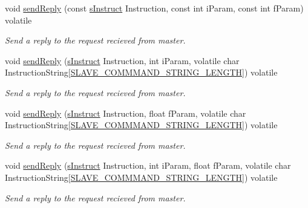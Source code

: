 \begin{DoxyCompactItemize}
void \mbox{\hyperlink{class_master_aa0f969c879b7d6ca105162ea2ca2c87e}{send\+Reply}} (const \mbox{\hyperlink{_s_p_i___instruction_set_8h_a949ec019a0f52780dcdd7d5a5ba73e47}{s\+Instruct}} Instruction, const int i\+Param, const int f\+Param) volatile
\begin{DoxyCompactList}\small\item\em Send a reply to the request recieved from master. \end{DoxyCompactList}\item 
void \mbox{\hyperlink{class_master_a075da7da71f50da0a5973ff65cc1a485}{send\+Reply}} (\mbox{\hyperlink{_s_p_i___instruction_set_8h_a949ec019a0f52780dcdd7d5a5ba73e47}{s\+Instruct}} Instruction, int i\+Param, volatile char Instruction\+String\mbox{[}\mbox{\hyperlink{_s_p_i___instruction_set_8h_afb2f23f8980c03317ec47ce151335ec7}{S\+L\+A\+V\+E\+\_\+\+C\+O\+M\+M\+M\+A\+N\+D\+\_\+\+S\+T\+R\+I\+N\+G\+\_\+\+L\+E\+N\+G\+TH}}\mbox{]}) volatile
\begin{DoxyCompactList}\small\item\em Send a reply to the request recieved from master. \end{DoxyCompactList}\item 
void \mbox{\hyperlink{class_master_acca62a1478bc305cdd8496f684ea3f9d}{send\+Reply}} (\mbox{\hyperlink{_s_p_i___instruction_set_8h_a949ec019a0f52780dcdd7d5a5ba73e47}{s\+Instruct}} Instruction, float f\+Param, volatile char Instruction\+String\mbox{[}\mbox{\hyperlink{_s_p_i___instruction_set_8h_afb2f23f8980c03317ec47ce151335ec7}{S\+L\+A\+V\+E\+\_\+\+C\+O\+M\+M\+M\+A\+N\+D\+\_\+\+S\+T\+R\+I\+N\+G\+\_\+\+L\+E\+N\+G\+TH}}\mbox{]}) volatile
\begin{DoxyCompactList}\small\item\em Send a reply to the request recieved from master. \end{DoxyCompactList}\item 
void \mbox{\hyperlink{class_master_a88fd38997e4ee0c26fd09a85477487fa}{send\+Reply}} (\mbox{\hyperlink{_s_p_i___instruction_set_8h_a949ec019a0f52780dcdd7d5a5ba73e47}{s\+Instruct}} Instruction, int i\+Param, float f\+Param, volatile char Instruction\+String\mbox{[}\mbox{\hyperlink{_s_p_i___instruction_set_8h_afb2f23f8980c03317ec47ce151335ec7}{S\+L\+A\+V\+E\+\_\+\+C\+O\+M\+M\+M\+A\+N\+D\+\_\+\+S\+T\+R\+I\+N\+G\+\_\+\+L\+E\+N\+G\+TH}}\mbox{]}) volatile
\begin{DoxyCompactList}\small\item\em Send a reply to the request recieved from master. \end{DoxyCompactList}\item 

\end{DoxyCompactItemize}
